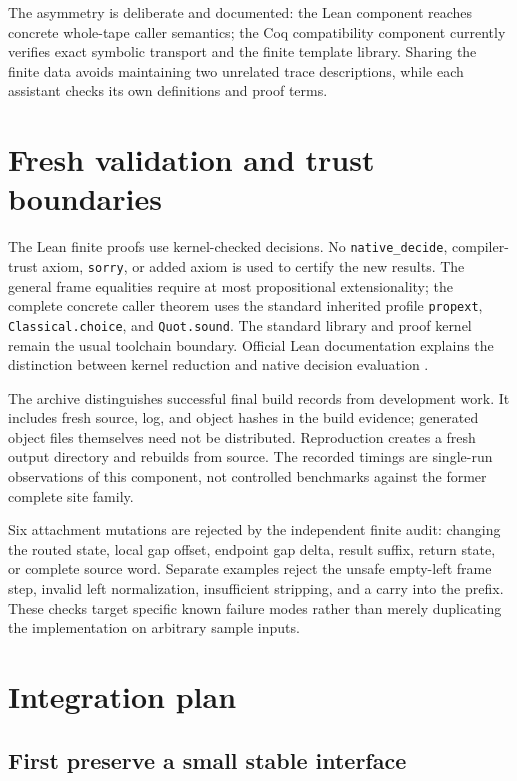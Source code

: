 \documentclass[11pt]{article}
\theoremstyle{definition}\newtheorem{definition}[theorem]{Definition}
\theoremstyle{remark}\newtheorem{remark}[theorem]{Remark}
\newcommand{\code}[1]{\nolinkurl{#1}}
\begin{document}
The asymmetry is deliberate and documented: the Lean component reaches concrete whole-tape caller semantics; the Coq compatibility component currently verifies exact symbolic transport and the finite template library. Sharing the finite data avoids maintaining two unrelated trace descriptions, while each assistant checks its own definitions and proof terms.

\section{Fresh validation and trust boundaries}



The Lean finite proofs use kernel-checked decisions. No \code{native_decide}, compiler-trust axiom, \code{sorry}, or added axiom is used to certify the new results. The general frame equalities require at most propositional extensionality; the complete concrete caller theorem uses the standard inherited profile \code{propext}, \code{Classical.choice}, and \code{Quot.sound}. The standard library and proof kernel remain the usual toolchain boundary. Official Lean documentation explains the distinction between kernel reduction and native decision evaluation \cite{lean-validation}.

The archive distinguishes successful final build records from development work. It includes fresh source, log, and object hashes in the build evidence; generated object files themselves need not be distributed. Reproduction creates a fresh output directory and rebuilds from source. The recorded timings are single-run observations of this component, not controlled benchmarks against the former complete site family.

Six attachment mutations are rejected by the independent finite audit: changing the routed state, local gap offset, endpoint gap delta, result suffix, return state, or complete source word. Separate examples reject the unsafe empty-left frame step, invalid left normalization, insufficient stripping, and a carry into the prefix. These checks target specific known failure modes rather than merely duplicating the implementation on arbitrary sample inputs.

\section{Integration plan}

\subsection{First preserve a small stable interface}
\end{document}
